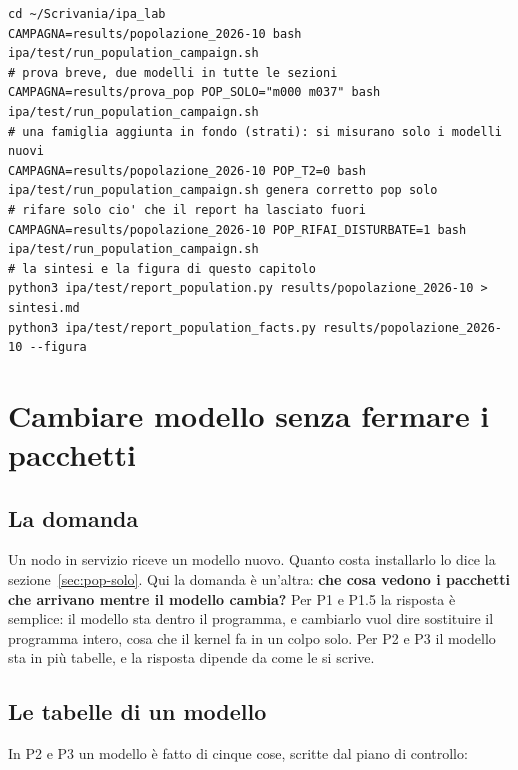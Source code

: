 \documentclass[11pt,a4paper,oneside]{report}
\begin{document}
\begin{lstlisting}
cd ~/Scrivania/ipa_lab
CAMPAGNA=results/popolazione_2026-10 bash ipa/test/run_population_campaign.sh
# prova breve, due modelli in tutte le sezioni
CAMPAGNA=results/prova_pop POP_SOLO="m000 m037" bash ipa/test/run_population_campaign.sh
# una famiglia aggiunta in fondo (strati): si misurano solo i modelli nuovi
CAMPAGNA=results/popolazione_2026-10 POP_T2=0 bash ipa/test/run_population_campaign.sh genera corretto pop solo
# rifare solo cio' che il report ha lasciato fuori
CAMPAGNA=results/popolazione_2026-10 POP_RIFAI_DISTURBATE=1 bash ipa/test/run_population_campaign.sh
# la sintesi e la figura di questo capitolo
python3 ipa/test/report_population.py results/popolazione_2026-10 > sintesi.md
python3 ipa/test/report_population_facts.py results/popolazione_2026-10 --figura
\end{lstlisting}

\chapter{Cambiare modello senza fermare i pacchetti}
\label{ch:cambio}

\section{La domanda}

Un nodo in servizio riceve un modello nuovo. Quanto costa installarlo lo dice la
sezione~\ref{sec:pop-solo}. Qui la domanda è un'altra: \textbf{che cosa vedono i
pacchetti che arrivano mentre il modello cambia?} Per P1 e P1.5 la risposta è
semplice: il modello sta dentro il programma, e cambiarlo vuol dire sostituire il
programma intero, cosa che il kernel fa in un colpo solo. Per P2 e P3 il modello
sta in più tabelle, e la risposta dipende da come le si scrive.

\section{Le tabelle di un modello}

In P2 e P3 un modello è fatto di cinque cose, scritte dal piano di controllo:
\end{document}
